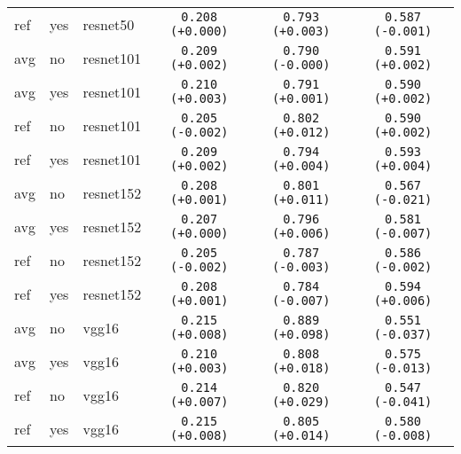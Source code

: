 \begin{tabular}{|l|l|l|c|c|c|}
ref & yes & resnet50 & \texttt{0.208} {\color{green}\texttt{(+0.000)}} & \texttt{0.793} {\color{red}\texttt{(+0.003)}} & \texttt{0.587} {\color{red}\texttt{(-0.001)}} \\
avg & no & resnet101 & \texttt{0.209} {\color{green}\texttt{(+0.002)}} & \texttt{0.790} {\color{black}\texttt{(-0.000)}} & \texttt{0.591} {\color{green}\texttt{(+0.002)}} \\
avg & yes & resnet101 & \texttt{0.210} {\color{green}\texttt{(+0.003)}} & \texttt{0.791} {\color{red}\texttt{(+0.001)}} & \texttt{0.590} {\color{green}\texttt{(+0.002)}} \\
ref & no & resnet101 & \texttt{0.205} {\color{red}\texttt{(-0.002)}} & \texttt{0.802} {\color{red}\texttt{(+0.012)}} & \texttt{0.590} {\color{green}\texttt{(+0.002)}} \\
ref & yes & resnet101 & \texttt{0.209} {\color{green}\texttt{(+0.002)}} & \texttt{0.794} {\color{red}\texttt{(+0.004)}} & \texttt{0.593} {\color{green}\texttt{(+0.004)}} \\
avg & no & resnet152 & \texttt{0.208} {\color{green}\texttt{(+0.001)}} & \texttt{0.801} {\color{red}\texttt{(+0.011)}} & \texttt{0.567} {\color{red}\texttt{(-0.021)}} \\
avg & yes & resnet152 & \texttt{0.207} {\color{green}\texttt{(+0.000)}} & \texttt{0.796} {\color{red}\texttt{(+0.006)}} & \texttt{0.581} {\color{red}\texttt{(-0.007)}} \\
ref & no & resnet152 & \texttt{0.205} {\color{red}\texttt{(-0.002)}} & \texttt{0.787} {\color{green}\texttt{(-0.003)}} & \texttt{0.586} {\color{red}\texttt{(-0.002)}} \\
ref & yes & resnet152 & \texttt{0.208} {\color{green}\texttt{(+0.001)}} & \texttt{0.784} {\color{green}\texttt{(-0.007)}} & \texttt{0.594} {\color{green}\texttt{(+0.006)}} \\
avg & no & vgg16 & \texttt{0.215} {\color{green}\texttt{(+0.008)}} & \texttt{0.889} {\color{red}\texttt{(+0.098)}} & \texttt{0.551} {\color{red}\texttt{(-0.037)}} \\
avg & yes & vgg16 & \texttt{0.210} {\color{green}\texttt{(+0.003)}} & \texttt{0.808} {\color{red}\texttt{(+0.018)}} & \texttt{0.575} {\color{red}\texttt{(-0.013)}} \\
ref & no & vgg16 & \texttt{0.214} {\color{green}\texttt{(+0.007)}} & \texttt{0.820} {\color{red}\texttt{(+0.029)}} & \texttt{0.547} {\color{red}\texttt{(-0.041)}} \\
ref & yes & vgg16 & \texttt{0.215} {\color{green}\texttt{(+0.008)}} & \texttt{0.805} {\color{red}\texttt{(+0.014)}} & \texttt{0.580} {\color{red}\texttt{(-0.008)}} \\

\end{tabular}
